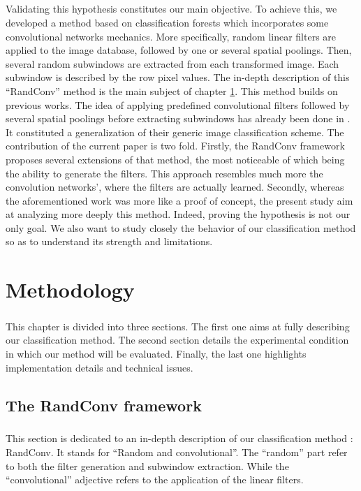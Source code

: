 \documentclass[a4paper]{report}
\begin{document}
\paragraph{}
Validating this hypothesis constitutes our main objective. To achieve this, we developed a method based on classification forests which incorporates some convolutional networks mechanics. More specifically, random linear filters are applied to the image database, followed by one or several spatial poolings. Then, several random subwindows are extracted from each transformed image. Each subwindow is described by the row pixel values.
The in-depth description of this ``RandConv'' method is the main subject of chapter \ref{chap:methodo}.
	This method builds on previous works. The idea of applying predefined convolutional filters followed by several spatial poolings before extracting subwindows has already been done in \cite{}. It constituted a generalization of their generic image classification scheme. The contribution of the current paper is two fold. 
	Firstly, the RandConv framework proposes several extensions of that method, the most noticeable of which being the ability to generate the filters. This approach resembles much more the convolution networks', where the filters are actually learned.
	Secondly, whereas the aforementioned work was more like a proof of concept, the present study aim at analyzing more deeply this method. Indeed, proving the hypothesis is not our only goal. We also want to study closely the behavior of our classification method so as to understand its strength and limitations.

\chapter{Methodology}
\label{chap:methodo}
\paragraph{}
This chapter is divided into three sections. The first one aims at fully describing our classification method. The second section details the experimental condition in which our method will be evaluated. Finally, the last one highlights implementation details and technical issues.
	\section{The RandConv framework}
	\paragraph{}
	This section is dedicated to an in-depth description of our classification method : RandConv. It stands for ``Random and 	convolutional''. The ``random'' part refer to both the filter generation and subwindow extraction. While the ``convolutional'' adjective refers to the application of the linear filters. 
\end{document}

